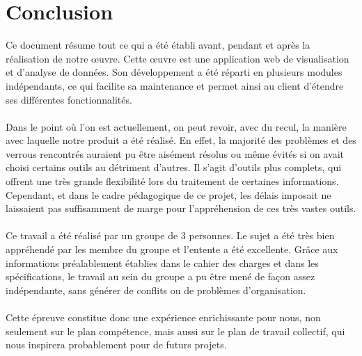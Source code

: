 	
	\section*{Conclusion}
	Ce document résume tout ce qui a été établi avant, pendant et après la réalisation de notre œuvre. Cette œuvre est une application web de visualisation et d'analyse de données. Son développement a été réparti en plusieurs modules indépendants, ce qui facilite sa maintenance et permet ainsi au client d'étendre ses différentes fonctionnalités.
	\paragraph{} Dans le point où l'on est actuellement, on peut revoir, avec du recul, la manière avec laquelle notre produit a été réalisé. En effet, la majorité des problèmes et des verrous rencontrés auraient pu être aisément résolus ou même évités si on avait choisi certains outils au détriment d'autres. Il s'agit d'outils plus complets, qui offrent une très grande flexibilité lors du traitement de certaines informations. Cependant, et dans le cadre pédagogique de ce projet, les délais imposait ne laissaient pas suffisamment de marge pour l'appréhension de ces très vastes outils.
	\paragraph{} Ce travail a été réalisé par un groupe de 3 personnes. Le sujet a été très bien appréhendé par les membre du groupe et l'entente a été excellente. Grâce aux informations préalablement établies dans le cahier des charges et dans les spécifications, le travail au sein du groupe a pu être mené de façon assez indépendante, sans générer de conflits ou de problèmes d'organisation.
	\paragraph{} Cette épreuve constitue donc une expérience enrichissante pour nous, non seulement sur le plan compétence, mais aussi sur le plan de travail collectif, qui nous inspirera probablement pour de futurs projets.
		

